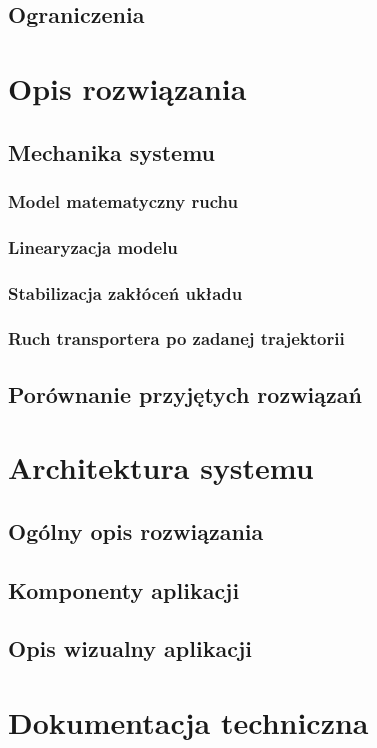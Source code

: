 \documentclass[12pt, oneside]{report}
\theoremstyle{definition}
\begin{document}
\section{Ograniczenia}


\newpage
\chapter{Opis rozwiązania}
\section{Mechanika systemu}
\subsection{Model matematyczny ruchu}
\subsection{Linearyzacja modelu}
\subsection{Stabilizacja zakłóceń układu}
\subsection{Ruch transportera po zadanej trajektorii}
\section{Porównanie przyjętych rozwiązań}


\chapter{Architektura systemu}
\section{Ogólny opis rozwiązania}
\section{Komponenty aplikacji}
\section{Opis wizualny aplikacji}


\newpage
\chapter{Dokumentacja techniczna}
\end{document}
